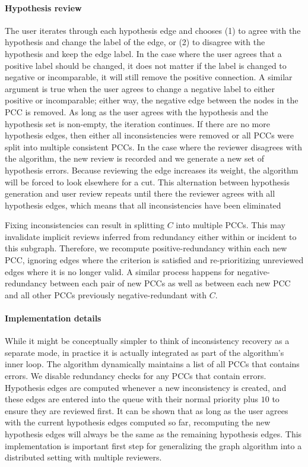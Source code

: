 \paragraph{Hypothesis review}
The user iterates through each hypothesis edge and chooses
(1) to agree with the hypothesis and change the label of the edge, or
(2) to disagree with the hypothesis and keep the edge label.
In the case where the user agrees that a positive label should be changed, it does not matter if the label is
  changed to negative or incomparable, it will still remove the positive connection.
A similar argument is true when the user agrees to change a negative label to either positive or incomparable;
  either way, the negative edge between the nodes in the PCC is removed.
As long as the user agrees with the hypothesis and the hypothesis set is non-empty, the iteration continues.
If there are no more hypothesis edges, then either all inconsistencies were removed or all PCCs were split into
  multiple consistent PCCs.
In the case where the reviewer disagrees with the algorithm, the new review is recorded and we generate a new set
  of hypothesis errors.
Because reviewing the edge increases its weight, the algorithm will be forced to look elsewhere for a cut.
This alternation between hypothesis generation and user review repeats until there the reviewer agrees with all
  hypothesis edges, which means that all inconsistencies have been eliminated

Fixing inconsistencies can result in splitting $C$ into multiple PCCs.
This may invalidate implicit reviews inferred from redundancy either within or incident to this subgraph.
Therefore, we recompute positive-redundancy within each new PCC, ignoring edges where the criterion is satisfied
  and re-prioritizing unreviewed edges where it is no longer valid.
A similar process happens for negative-redundancy between each pair of new PCCs as well as between each new PCC
  and all other PCCs previously negative-redundant with $C$.

\paragraph{Implementation details}
While it might be conceptually simpler to think of inconsistency recovery as a separate mode, in practice it is
  actually integrated as part of the algorithm's inner loop.
The algorithm dynamically maintains a list of all PCCs that contains errors.
We disable redundancy checks for any PCCs that contain errors.
Hypothesis edges are computed whenever a new inconsistency is created, and these edges are entered into the queue
  with their normal priority plus $10$ to ensure they are reviewed first.
It can be shown that as long as the user agrees with the current hypothesis edges computed so far, recomputing
  the new hypothesis edges will always be the same as the remaining hypothesis edges.
This implementation is important first step for generalizing the graph algorithm into a distributed setting with
  multiple reviewers.


